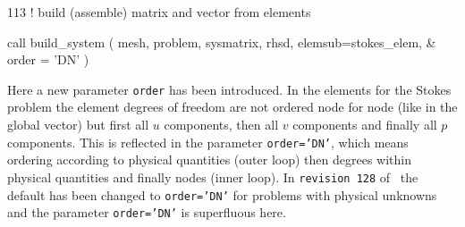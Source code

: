 \begin{listing}{113}
! build (assemble) matrix and vector from elements
                                                                                
  call build_system ( mesh, problem, sysmatrix, rhsd, elemsub=stokes_elem, &
    order = 'DN' )
                                                                                
\end{listing}
Here a new parameter \texttt{order} has been introduced. In the elements for
the Stokes problem the element degrees of freedom are not ordered node for node
(like in the global vector) but first all $u$ components, then all $v$
components and finally all $p$ components. This is reflected in the parameter 
\texttt{order='DN'}, which means ordering according to physical quantities
(outer loop) then degrees within physical quantities and finally
nodes (inner loop). In \texttt{revision 128} of \tfem\ the default has been
changed to \texttt{order='DN'} for problems with physical unknowns and the
parameter \texttt{order='DN'} is superfluous here.


